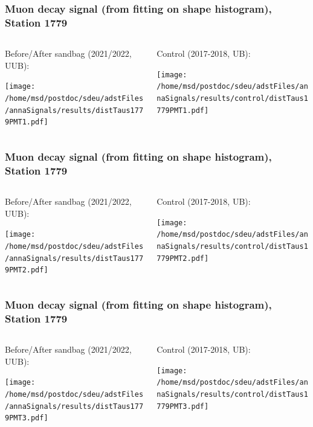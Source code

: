 \documentclass[aspectratio=169]{beamer}
\begin{document}
\begin{frame}
  \frametitle{Muon decay signal (from fitting on shape histogram), Station 1779}
  
  \begin{columns}[T,c]
    \begin{column}{.5\textwidth}
      Before/After sandbag (2021/2022, UUB):
      \vspace{.3cm}

      \texttt{[image: /home/msd/postdoc/sdeu/adstFiles/annaSignals/results/distTaus1779PMT1.pdf]}
    \end{column}
    \begin{column}{.5\textwidth}
      Control (2017-2018, UB):
      \vspace{0.3cm}

      \texttt{[image: /home/msd/postdoc/sdeu/adstFiles/annaSignals/results/control/distTaus1779PMT1.pdf]}
    \end{column}
  \end{columns}
\end{frame}

\begin{frame}
  \frametitle{Muon decay signal (from fitting on shape histogram), Station 1779}
  
  \begin{columns}[T,c]
    \begin{column}{.5\textwidth}
      Before/After sandbag (2021/2022, UUB):
      \vspace{.3cm}

      \texttt{[image: /home/msd/postdoc/sdeu/adstFiles/annaSignals/results/distTaus1779PMT2.pdf]}
    \end{column}
    \begin{column}{.5\textwidth}
      Control (2017-2018, UB):
      \vspace{0.3cm}

      \texttt{[image: /home/msd/postdoc/sdeu/adstFiles/annaSignals/results/control/distTaus1779PMT2.pdf]}
    \end{column}    
\end{columns}
\end{frame}

\begin{frame}
  \frametitle{Muon decay signal (from fitting on shape histogram), Station 1779}
  
  \begin{columns}[T,c]
    \begin{column}{.5\textwidth}
      Before/After sandbag (2021/2022, UUB):
      \vspace{.3cm}

      \texttt{[image: /home/msd/postdoc/sdeu/adstFiles/annaSignals/results/distTaus1779PMT3.pdf]}
    \end{column}
    \begin{column}{.5\textwidth}
      Control (2017-2018, UB):
      \vspace{0.3cm}

      \texttt{[image: /home/msd/postdoc/sdeu/adstFiles/annaSignals/results/control/distTaus1779PMT3.pdf]}
    \end{column}    
\end{columns}
\end{frame}
\end{document}
